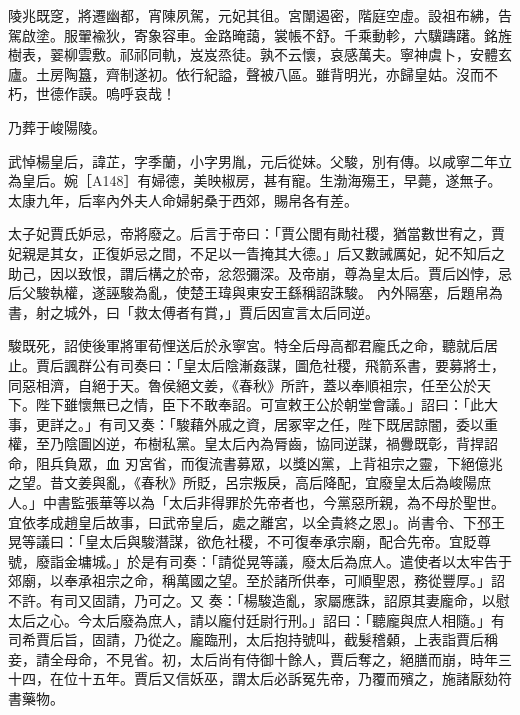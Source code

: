 \begin{pinyinscope}
 陵兆既窆，將遷幽都，宵陳夙駕，元妃其徂。宮闈遏密，階庭空虛。設祖布紼，告駕啟塗。服翬褕狄，寄象容車。金路晻藹，裳帳不舒。千乘動軫，六驥躊躇。銘旌樹表，翣柳雲敷。祁祁同軌，岌岌烝徒。孰不云懷，哀感萬夫。寧神虞卜，安體玄廬。土房陶簋，齊制遂初。依行紀謚，聲被八區。雖背明光，亦歸皇姑。沒而不朽，世德作謨。嗚呼哀哉！



 乃葬于峻陽陵。



 武悼楊皇后，諱芷，字季蘭，小字男胤，元后從妹。父駿，別有傳。以咸寧二年立為皇后。婉［A148］有婦德，美映椒房，甚有寵。生渤海殤王，早薨，遂無子。太康九年，后率內外夫人命婦躬桑于西郊，賜帛各有差。



 太子妃賈氏妒忌，帝將廢之。后言于帝曰：「賈公閭有勛社稷，猶當數世宥之，賈妃親是其女，正復妒忌之間，不足以一眚掩其大德。」后又數誡厲妃，妃不知后之助己，因以致恨，謂后構之於帝，忿怨彌深。及帝崩，尊為皇太后。賈后凶悖，忌后父駿執權，遂誣駿為亂，使楚王瑋與東安王繇稱詔誅駿。
 內外隔塞，后題帛為書，射之城外，曰「救太傅者有賞，」賈后因宣言太后同逆。



 駿既死，詔使後軍將軍荀悝送后於永寧宮。特全后母高都君龐氏之命，聽就后居止。賈后諷群公有司奏曰：「皇太后陰漸姦謀，圖危社稷，飛箭系書，要募將士，同惡相濟，自絕于天。魯侯絕文姜，《春秋》所許，蓋以奉順祖宗，任至公於天下。陛下雖懷無已之情，臣下不敢奉詔。可宣敕王公於朝堂會議。」詔曰：「此大事，更詳之。」有司又奏：「駿藉外戚之資，居冢宰之任，陛下既居諒闇，委以重權，至乃陰圖凶逆，布樹私黨。皇太后內為脣齒，協同逆謀，禍釁既彰，背捍詔命，阻兵負眾，血
 刃宮省，而復流書募眾，以獎凶黨，上背祖宗之靈，下絕億兆之望。昔文姜與亂，《春秋》所貶，呂宗叛戾，高后降配，宜廢皇太后為峻陽庶人。」中書監張華等以為「太后非得罪於先帝者也，今黨惡所親，為不母於聖世。宜依孝成趙皇后故事，曰武帝皇后，處之離宮，以全貴終之恩」。尚書令、下邳王晃等議曰：「皇太后與駿潛謀，欲危社稷，不可復奉承宗廟，配合先帝。宜貶尊號，廢詣金墉城。」於是有司奏：「請從晃等議，廢太后為庶人。遣使者以太牢告于郊廟，以奉承祖宗之命，稱萬國之望。至於諸所供奉，可順聖恩，務從豐厚。」詔不許。有司又固請，乃可之。又
 奏：「楊駿造亂，家屬應誅，詔原其妻龐命，以慰太后之心。今太后廢為庶人，請以龐付廷尉行刑。」詔曰：「聽龐與庶人相隨。」有司希賈后旨，固請，乃從之。龐臨刑，太后抱持號叫，截髮稽顙，上表詣賈后稱妾，請全母命，不見省。初，太后尚有侍御十餘人，賈后奪之，絕膳而崩，時年三十四，在位十五年。賈后又信妖巫，謂太后必訴冤先帝，乃覆而殯之，施諸厭劾符書藥物。




\end{pinyinscope}
